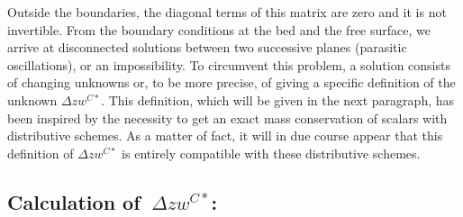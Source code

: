 Outside the boundaries, the diagonal terms of this matrix are zero and it is not
invertible. From the boundary conditions at the bed and the free surface, we arrive at
disconnected solutions between two successive planes (parasitic oscillations),
or an impossibility.
%
%
To circumvent this problem, a solution consists of changing unknowns or, to
be more precise, of giving a specific definition of the unknown $\Delta
zw^{C\ast}$. This definition, which will be given in the next paragraph, has
been inspired by the necessity to get an exact mass conservation of scalars
with distributive schemes. As a matter of fact, it will in due course appear
that this definition of $\Delta zw^{C\ast}$ is entirely compatible with these
distributive schemes.

\subsection{\label{wstarmoyen}Calculation of $\ \Delta zw^{C\ast}$:}

